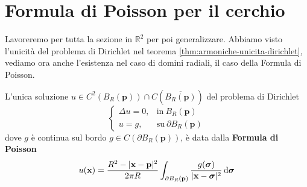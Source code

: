 \section{Formula di Poisson per il cerchio}
Lavoreremo per tutta la sezione in $\displaystyle \mathbb{R}^{2}$ per poi generalizzare.
Abbiamo visto l'unicità del problema di Dirichlet nel teorema \ref{thm:armoniche-unicita-dirichlet}, vediamo ora anche l'esistenza nel caso di domini radiali, il caso della Formula di Poisson.
\begin{theorem}
    L'unica soluzione $u\in C^{2}(B_{R}(\mathbf{p})) \cap C\left(\overline{B_{R}(\mathbf{p})}\right)$ del problema di Dirichlet
    \begin{equation*}
        \begin{cases}
            \Delta u=0, & \text{in} \ B_{R}(\mathbf{p})          \\
            u=g,        & \text{su} \ \partial B_{R}(\mathbf{p})
        \end{cases}
    \end{equation*}
    dove $g$ è continua sul bordo $g\in C(\partial B_{R}(\mathbf{p}))$, è data dalla \textbf{Formula di Poisson}
    \begin{equation}
        \label{eq:poisson-cerchio}
        u(\mathbf{x}) =\frac{R^{2} -| \mathbf{x}-\mathbf{p}| ^{2}}{2\pi R}\int _{\partial B_{R}(\mathbf{p})}\frac{g(\bm{\sigma})}{| \mathbf{x}-\bm{\sigma} | ^{2}} \,\mathrm d \bm{\sigma}
    \end{equation}
\end{theorem}
